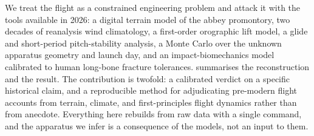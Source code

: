 We treat the flight as a constrained engineering problem and attack it with the
tools available in 2026: a digital terrain model of the abbey promontory, two
decades of reanalysis wind climatology, a first-order orographic lift model, a
glide and short-period pitch-stability analysis, a Monte Carlo over the unknown
apparatus geometry and launch day, and an impact-biomechanics model calibrated to
human long-bone fracture tolerances.
 summarises the reconstruction and the result.
The contribution is twofold: a calibrated verdict on a specific historical claim,
and a reproducible method for adjudicating pre-modern flight accounts from terrain,
climate, and first-principles flight dynamics rather than from anecdote.
Everything here rebuilds from raw data with a single command, and the apparatus we
infer is a consequence of the models, not an input to them.
